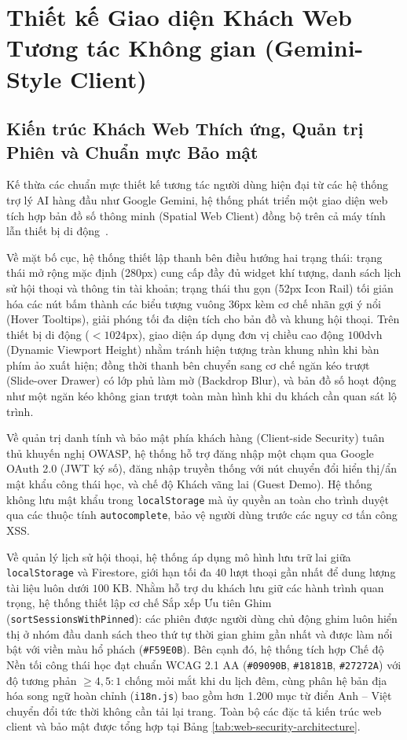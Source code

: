 \section{Thiết kế Giao diện Khách Web Tương tác Không gian (Gemini-Style Client)}
\label{sec:ch1-frontend-design}

\subsection{Kiến trúc Khách Web Thích ứng, Quản trị Phiên và Chuẩn mực Bảo mật}
\label{subsec:ch1-web-client-security}

Kế thừa các chuẩn mực thiết kế tương tác người dùng hiện đại từ các hệ thống trợ lý AI hàng đầu như Google Gemini, hệ thống phát triển một giao diện web tích hợp bản đồ số thông minh (Spatial Web Client) đồng bộ trên cả máy tính lẫn thiết bị di động~\cite{sugumaran2010spatial, marcotte2010responsive}.

Về mặt bố cục, hệ thống thiết lập thanh bên điều hướng hai trạng thái: trạng thái mở rộng mặc định (280px) cung cấp đầy đủ widget khí tượng, danh sách lịch sử hội thoại và thông tin tài khoản; trạng thái thu gọn (52px Icon Rail) tối giản hóa các nút bấm thành các biểu tượng vuông 36px kèm cơ chế nhãn gợi ý nổi (Hover Tooltips), giải phóng tối đa diện tích cho bản đồ và khung hội thoại. Trên thiết bị di động ($< 1024\text{px}$), giao diện áp dụng đơn vị chiều cao động $100\text{dvh}$ (Dynamic Viewport Height) nhằm tránh hiện tượng tràn khung nhìn khi bàn phím ảo xuất hiện; đồng thời thanh bên chuyển sang cơ chế ngăn kéo trượt (Slide-over Drawer) có lớp phủ làm mờ (Backdrop Blur), và bản đồ số hoạt động như một ngăn kéo không gian trượt toàn màn hình khi du khách cần quan sát lộ trình.

Về quản trị danh tính và bảo mật phía khách hàng (Client-side Security) tuân thủ khuyến nghị OWASP, hệ thống hỗ trợ đăng nhập một chạm qua Google OAuth 2.0 (JWT ký số), đăng nhập truyền thống với nút chuyển đổi hiển thị/ẩn mật khẩu công thái học, và chế độ Khách vãng lai (Guest Demo). Hệ thống không lưu mật khẩu trong \texttt{localStorage} mà ủy quyền an toàn cho trình duyệt qua các thuộc tính \texttt{autocomplete}, bảo vệ người dùng trước các nguy cơ tấn công XSS.

Về quản lý lịch sử hội thoại, hệ thống áp dụng mô hình lưu trữ lai giữa \texttt{localStorage} và Firestore, giới hạn tối đa 40 lượt thoại gần nhất để dung lượng tài liệu luôn dưới $100\text{ KB}$. Nhằm hỗ trợ du khách lưu giữ các hành trình quan trọng, hệ thống thiết lập cơ chế Sắp xếp Ưu tiên Ghim (\texttt{sortSessions\allowbreak WithPinned}): các phiên được người dùng chủ động ghim luôn hiển thị ở nhóm đầu danh sách theo thứ tự thời gian ghim gần nhất và được làm nổi bật với viền màu hổ phách (\texttt{\#F59E0B}). Bên cạnh đó, hệ thống tích hợp Chế độ Nền tối công thái học đạt chuẩn WCAG 2.1 AA (\texttt{\#09090B}, \texttt{\#18181B}, \texttt{\#27272A}) với độ tương phản $\ge 4{,}5:1$ chống mỏi mắt khi du lịch đêm, cùng phân hệ bản địa hóa song ngữ hoàn chỉnh (\texttt{i18n.js}) bao gồm hơn 1.200 mục từ điển Anh -- Việt chuyển đổi tức thời không cần tải lại trang. Toàn bộ các đặc tả kiến trúc web client và bảo mật được tổng hợp tại Bảng \ref{tab:web-security-architecture}.

